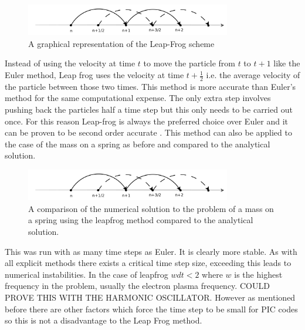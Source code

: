 \begin{figure}[H]
\centering
\includegraphics[width=0.8\textwidth]{Leapfrog}
\caption{A graphical representation of the Leap-Frog scheme\cite{shape}}
\label{fig:Leapfrog}
\end{figure}
Instead of using the velocity at time $t$ to move the particle from $t$ to $t+1$ like the Euler method, Leap frog uses the velocity at time $t+\frac{1}{2}$ i.e. the average velocity of the particle between those two times. This method is more accurate than Euler's method for the same computational expense. The only extra step involves pushing back the particles half a time step but this only needs to be carried out once. For this reason Leap-frog is always the preferred choice over Euler and it can be proven to be second order accurate \cite{second_order}.
This method can also be applied to the case of the mass on a spring as before and compared to the analytical solution.
\begin{figure}[H]
\centering
\includegraphics[width=0.8\textwidth]{leapfrog}
\caption{A comparison of the numerical solution to the problem of a mass on a spring using the leapfrog method compared to the analytical solution.}
\end{figure}
This was run with as many time steps as Euler. It is clearly more stable. As with all explicit methods there exists a critical time step size, exceeding this leads to numerical instabilities. In the case of leapfrog $w dt <2 $ where $w$ is the highest frequency in the problem, usually the electron plasma frequency. COULD PROVE THIS WITH THE HARMONIC OSCILLATOR. However as mentioned before there are other factors which force the time step to be small for PIC codes so this is not a disadvantage to the Leap Frog method.